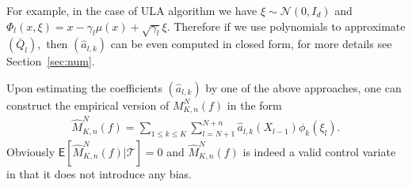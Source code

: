 \documentclass[aap,preprint]{imsart}
\def\TrainSet{\mathcal{T}}
\begin{document}
 For example, in the case of ULA algorithm we have \(\xi\sim \mathcal{N}(0,I_d)\) and \(\Phi_l(x,\xi)=x-\gamma_{l}\mu(x)+\sqrt{\gamma_{l}}\xi.\) Therefore if we use polynomials to approximate \((\bar Q_{l}),\) then \((\widehat a_{l,k})\) can be even computed in closed form, for more details see Section~\ref{sec:num}.

Upon estimating  the coefficients \((\widehat a_{l,k})\) by one of the above approaches, one can construct the empirical version of \(M_{K,n}^N(f)\) in the form
\begin{eqnarray*}
\widehat M_{K,n}^N(f) =\sum_{1\leq  k \le K}\sum_{l=N+1}^{N+n}\widehat a_{l,k}(X_{l-1})\phi_k(\xi_{l}).
\end{eqnarray*}
Obviously \(\mathsf{E}[\widehat M_{K,n}^N(f)|\TrainSet]=0\) and \(\widehat M_{K,n}^N(f)\) is indeed a valid control variate in that it
does not introduce any bias.
\end{document}
